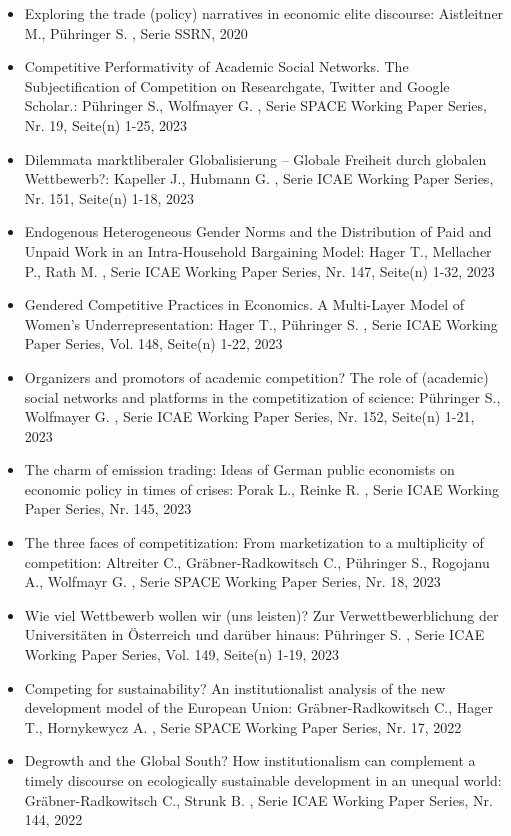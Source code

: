 \begin{itemize}
\item Exploring the trade (policy) narratives in economic elite discourse: Aistleitner M., Pühringer S. , Serie SSRN, 2020
\item Competitive Performativity of Academic Social Networks. The Subjectification of Competition on Researchgate, Twitter and Google Scholar.: Pühringer S., Wolfmayer G. , Serie SPACE Working Paper Series, Nr. 19, Seite(n) 1-25, 2023
\item Dilemmata marktliberaler Globalisierung – Globale Freiheit durch globalen Wettbewerb?: Kapeller J., Hubmann G. , Serie ICAE Working Paper Series, Nr. 151, Seite(n) 1-18, 2023
\item Endogenous Heterogeneous Gender Norms and the Distribution of Paid and Unpaid Work in an Intra-Household Bargaining Model: Hager T., Mellacher P., Rath M. , Serie ICAE Working Paper Series, Nr. 147, Seite(n) 1-32, 2023
\item Gendered Competitive Practices in Economics. A Multi-Layer Model of Women’s Underrepresentation: Hager T., Pühringer S. , Serie ICAE Working Paper Series, Vol. 148, Seite(n) 1-22, 2023
\item Organizers and promotors of academic competition? The role of (academic) social networks and platforms in the competitization of science: Pühringer S., Wolfmayer G. , Serie ICAE Working Paper Series, Nr. 152, Seite(n) 1-21, 2023
\item The charm of emission trading: Ideas of German public economists on economic policy in times of crises: Porak L., Reinke R. , Serie ICAE Working Paper Series, Nr. 145, 2023
\item The three faces of competitization: From marketization to a multiplicity of competition: Altreiter C., Gräbner-Radkowitsch C., Pühringer S., Rogojanu A., Wolfmayr G. , Serie SPACE Working Paper Series, Nr. 18, 2023
\item Wie viel Wettbewerb wollen wir (uns leisten)? Zur Verwettbewerblichung der Universitäten in Österreich und darüber hinaus: Pühringer S. , Serie ICAE Working Paper Series, Vol. 149, Seite(n) 1-19, 2023
\item Competing for sustainability? An institutionalist analysis of the new development model of the European Union: Gräbner-Radkowitsch C., Hager T., Hornykewycz A. , Serie SPACE Working Paper Series, Nr. 17, 2022
\item Degrowth and the Global South? How institutionalism can complement a timely discourse on ecologically sustainable development in an unequal world: Gräbner-Radkowitsch C., Strunk B. , Serie ICAE Working Paper Series, Nr. 144, 2022

\end{itemize}
